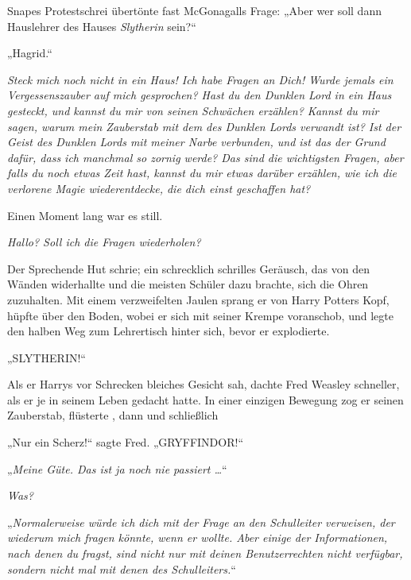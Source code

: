 Snapes Protestschrei übertönte fast McGonagalls Frage:
„Aber wer soll dann Hauslehrer des Hauses \emph{Slytherin} sein?“

„Hagrid.“

\later

\emph{Steck mich noch nicht in ein Haus! Ich habe Fragen an Dich! Wurde jemals ein Vergessenszauber auf mich gesprochen? Hast du den Dunklen Lord in ein Haus gesteckt, und kannst du mir von seinen Schwächen erzählen? Kannst du mir sagen, warum mein Zauberstab mit dem des Dunklen Lords verwandt ist? Ist der Geist des Dunklen Lords mit meiner Narbe verbunden, und ist das der Grund dafür, dass ich manchmal so zornig werde? Das sind die wichtigsten Fragen, aber falls du noch etwas Zeit hast, kannst du mir etwas darüber erzählen, wie ich die verlorene Magie wiederentdecke, die dich einst geschaffen hat?}

Einen Moment lang war es still.

\emph{Hallo? Soll ich die Fragen wiederholen?}

Der Sprechende Hut schrie; ein schrecklich schrilles Geräusch, das von den Wänden widerhallte und die meisten Schüler dazu brachte, sich die Ohren zuzuhalten. Mit einem verzweifelten Jaulen sprang er von Harry Potters Kopf, hüpfte über den Boden, wobei er sich mit seiner Krempe voranschob, und legte den halben Weg zum Lehrertisch hinter sich, bevor er explodierte.

\later

„SLYTHERIN!“

Als er Harrys vor Schrecken bleiches Gesicht sah, dachte Fred Weasley schneller, als er je in seinem Leben gedacht hatte. In einer einzigen Bewegung zog er seinen Zauberstab, flüsterte , dann  und schließlich %

„Nur ein Scherz!“ sagte Fred.
„GRYFFINDOR!“

\later

„\emph{Meine Güte. Das ist ja noch nie passiert …}“

\emph{Was?}

„\emph{Normalerweise würde ich dich mit der Frage an den Schulleiter verweisen, der wiederum mich fragen könnte, wenn er wollte. Aber einige der Informationen, nach denen du fragst, sind nicht nur mit deinen Benutzerrechten nicht verfügbar, sondern nicht mal mit denen des Schulleiters.}“

